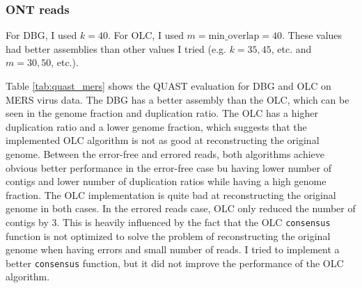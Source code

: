 \documentclass[12pt]{article}
\begin{document}
\subsubsection{ONT reads}
For DBG, I used $k = 40$. For OLC, I used $m = \text{min\_overlap} = 40$. These values had better assemblies than other values I tried (e.g. $k = 35,45$, etc. and $m = 30,50$, etc.).

Table \ref{tab:quast_mers} shows the QUAST evaluation for DBG and OLC on MERS virus data. The DBG has a better assembly than the OLC, which can be seen in the genome fraction and duplication ratio. The OLC has a higher duplication ratio and a lower genome fraction, which suggests that the implemented OLC algorithm is not as good at reconstructing the original genome.
Between the error-free and errored reads, both algorithms achieve obvious better performance in the error-free case bu having lower number of contigs and lower number of duplication ratios while having a high genome fraction. The OLC implementation is quite bad at reconstructing the original genome in both cases. In the errored reads case, OLC only reduced the number of contigs by 3. 
This is heavily influenced by the fact that the OLC \texttt{consensus} function is not optimized to solve the problem of reconstructing the original genome when having errors and small number of reads. I tried to implement a better \texttt{consensus} function, but it did not improve the performance of the OLC algorithm.
\end{document}
